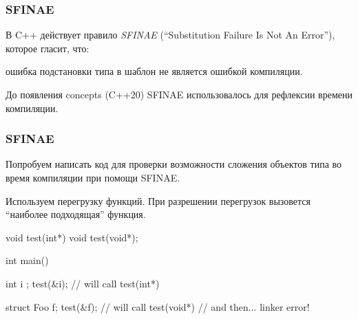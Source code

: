 \documentclass[compress, 8pt, aspectratio=169]{beamer}
\begin{document}
  \begin{frame}[fragile]

    \frametitle{SFINAE}

    В C++ действует правило \textit{SFINAE}\footnotemark{}
    (\enquote{Substitution Failure Is Not An Error}), которое гласит, что:


    \begin{tcolorbox}
      ошибка подстановки типа в шаблон не является ошибкой
      компиляции\footnotemark{}.
    \end{tcolorbox}


    До появления concepts (C++20) SFINAE использовалось для рефлексии\footnotemark{}
    времени компиляции.


  \end{frame}

  \begin{frame}[fragile]

    \frametitle{SFINAE}

    Попробуем написать код для проверки возможности сложения объектов типа
    во время компиляции при помощи SFINAE.

    Используем перегрузку функций.
    При разрешении перегрузок вызовется \enquote{наиболее подходящая}
    функция.

    \begin{myinplacelisting}[minted language=cpp]
void test(int*) {}
void test(void*);

int main() {
    int i {};
    test(&i); // will call test(int*)

    struct Foo {} f;
    test(&f); // will call test(void*)
              // and then... linker error!
}
    \end{myinplacelisting}

  \end{frame}
\end{document}
